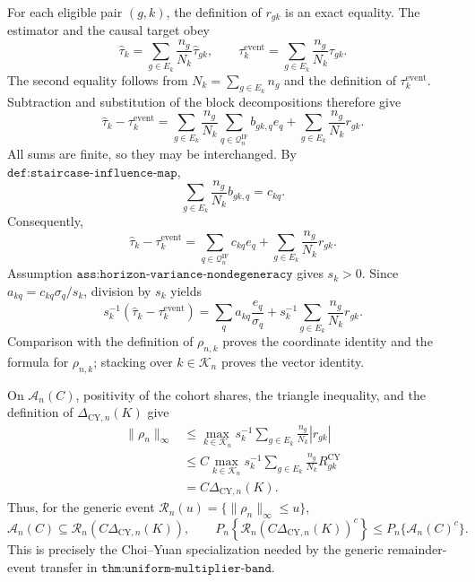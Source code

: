 For each eligible pair \((g,k)\), the definition of \(r_{gk}\) is an
exact equality.  The estimator and the causal target obey
\[
 \widehat\tau_k=\sum_{g\in E_k}\frac{n_g}{N_k}\widehat\tau_{gk},
 \qquad
 \tau_k^{\mathrm{event}}
 =\sum_{g\in E_k}\frac{n_g}{N_k}\tau_{gk}.
\]
The second equality follows from \(N_k=\sum_{g\in E_k}n_g\) and the
definition of \(\tau_k^{\mathrm{event}}\).  Subtraction and substitution
of the block decompositions therefore give
\[
 \widehat\tau_k-\tau_k^{\mathrm{event}}
 =\sum_{g\in E_k}\frac{n_g}{N_k}
   \sum_{q\in\mathcal Q_n^{\mathrm{IF}}}b_{gk,q}e_q
  +\sum_{g\in E_k}\frac{n_g}{N_k}r_{gk}.
\]
All sums are finite, so they may be interchanged.  By
\(\texttt{def:staircase-influence-map}\),
\[
 \sum_{g\in E_k}\frac{n_g}{N_k}b_{gk,q}=c_{kq}.
\]
Consequently,
\[
 \widehat\tau_k-\tau_k^{\mathrm{event}}
 =\sum_{q\in\mathcal Q_n^{\mathrm{IF}}}c_{kq}e_q
  +\sum_{g\in E_k}\frac{n_g}{N_k}r_{gk}.
\]
Assumption \(\texttt{ass:horizon-variance-nondegeneracy}\) gives
\(s_k>0\).  Since \(a_{kq}=c_{kq}\sigma_q/s_k\), division by \(s_k\)
yields
\[
 s_k^{-1}(\widehat\tau_k-\tau_k^{\mathrm{event}})
 =\sum_q a_{kq}\frac{e_q}{\sigma_q}
  +s_k^{-1}\sum_{g\in E_k}\frac{n_g}{N_k}r_{gk}.
\]
Comparison with the definition of \(\rho_{n,k}\) proves the coordinate
identity and the formula for \(\rho_{n,k}\); stacking over
\(k\in\mathcal K_n\) proves the vector identity.

On \(\mathcal A_n(C)\), positivity of the cohort shares, the triangle
inequality, and the definition of \(\Delta_{\mathrm{CY},n}(K)\) give
\[
 \begin{aligned}
 \|\rho_n\|_\infty
 &\le \max_{k\in\mathcal K_n}s_k^{-1}
       \sum_{g\in E_k}\frac{n_g}{N_k}|r_{gk}|\\
 &\le C\max_{k\in\mathcal K_n}s_k^{-1}
       \sum_{g\in E_k}\frac{n_g}{N_k}R_{gk}^{\mathrm{CY}}\\
 &=C\Delta_{\mathrm{CY},n}(K).
 \end{aligned}
\]
Thus, for the generic event
\(\mathcal R_n(u)=\{\|\rho_n\|_\infty\le u\}\),
\[
 \mathcal A_n(C)\subseteq
 \mathcal R_n\!\left(C\Delta_{\mathrm{CY},n}(K)\right),
 \qquad
 P_n\!\left\{\mathcal R_n\!\left(C\Delta_{\mathrm{CY},n}(K)\right)^c\right\}
 \le P_n\{\mathcal A_n(C)^c\}.
\]
This is precisely the Choi--Yuan specialization needed by the generic
remainder-event transfer in \(\texttt{thm:uniform-multiplier-band}\).

